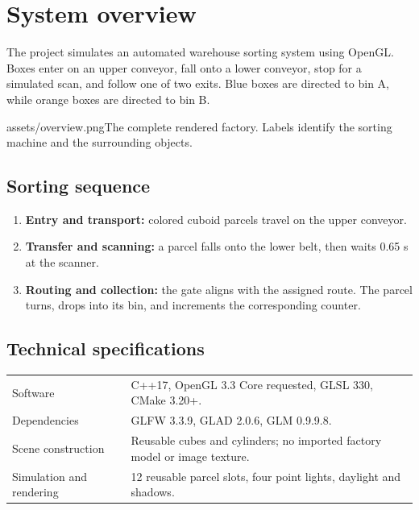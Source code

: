 \section{System overview}
\label{sec:visual_tour}
The project simulates an automated warehouse sorting system using OpenGL. Boxes enter on an upper conveyor, fall onto a lower conveyor, stop for a simulated scan, and follow one of two exits. Blue boxes are directed to bin A, while orange boxes are directed to bin B.
\begin{shot}{assets/overview.png}{The complete rendered factory. Labels identify the sorting machine and the surrounding objects.}
\end{shot}
\subsection{Sorting sequence}
\begin{enumerate}
\item \textbf{Entry and transport:} colored cuboid parcels travel on the upper conveyor.
\item \textbf{Transfer and scanning:} a parcel falls onto the lower belt, then waits 0.65 s at the scanner.
\item \textbf{Routing and collection:} the gate aligns with the assigned route. The parcel turns, drops into its bin, and increments the corresponding counter.
\end{enumerate}
\subsection{Technical specifications}
\par{\small\begin{tabularx}{\textwidth}{@{}L{34mm}Y@{}}\toprule
Software & C++17, OpenGL 3.3 Core requested, GLSL 330, CMake 3.20+.\\
Dependencies & GLFW 3.3.9, GLAD 2.0.6, GLM 0.9.9.8.\\
Scene construction & Reusable cubes and cylinders; no imported factory model or image texture.\\
Simulation and rendering & 12 reusable parcel slots, four point lights, daylight and shadows.\\\bottomrule
\end{tabularx}}\par
